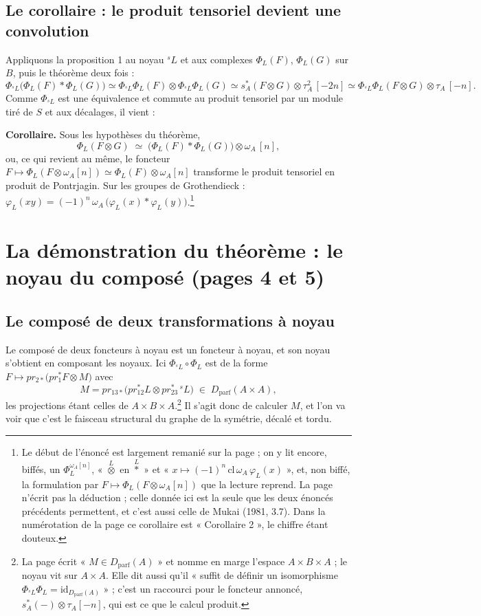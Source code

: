 \documentclass[11pt,a4paper]{article}
\begin{document}
\subsection*{Le corollaire : le produit tensoriel devient une convolution}

Appliquons la proposition 1 au noyau ${}^{s}L$ et aux complexes $\Phi_L(F)$,
$\Phi_L(G)$ sur $B$, puis le théorème deux fois :
\[
  \Phi_{{}^{s}L}\bigl(\Phi_L(F) * \Phi_L(G)\bigr)
  \simeq \Phi_{{}^{s}L}\Phi_L(F) \otimes \Phi_{{}^{s}L}\Phi_L(G)
  \simeq s_A^{*}(F \otimes G) \otimes \tau_A^{2}\,[-2n]
  \simeq \Phi_{{}^{s}L}\Phi_L(F \otimes G) \otimes \tau_A\,[-n].
\]
Comme $\Phi_{{}^{s}L}$ est une équivalence et commute au produit tensoriel
par un module tiré de $S$ et aux décalages, il vient :

\textbf{Corollaire.} Sous les hypothèses du théorème,
\[
  \Phi_L(F \otimes G) \;\simeq\; \bigl(\Phi_L(F) * \Phi_L(G)\bigr) \otimes \omega_A\,[n],
\]
ou, ce qui revient au même, le foncteur $F \mapsto \Phi_L(F \otimes
\omega_A[n]) \simeq \Phi_L(F) \otimes \omega_A[n]$ transforme le produit
tensoriel en produit de Pontrjagin. Sur les groupes de Grothendieck :
$\varphi_L(xy) = (-1)^n\,\omega_A\,\bigl(\varphi_L(x) * \varphi_L(y)\bigr)$.\footnote{Le début de l'énoncé est largement remanié sur la page ; on y lit
encore, biffés, un $\Phi_L^{\omega_A[n]}$, « $\overset{L}{\otimes}$ en
$\overset{L}{*}$ » et « $x \mapsto (-1)^n\,\mathrm{cl}\,\omega_A\,
\varphi_L(x)$ », et, non biffé, la formulation par $F \mapsto \Phi_L(F
\otimes \omega_A[n])$ que la lecture reprend. La page n'écrit pas la
déduction ; celle donnée ici est la seule que les deux énoncés précédents
permettent, et c'est aussi celle de Mukai (1981, 3.7). Dans la numérotation de
la page ce corollaire est « Corollaire 2 », le chiffre étant douteux.}

\section*{La démonstration du théorème : le noyau du composé (pages 4 et 5)}

\subsection*{Le composé de deux transformations à noyau}

Le composé de deux foncteurs à noyau est un foncteur à noyau, et son noyau
s'obtient en composant les noyaux. Ici
$\Phi_{{}^{s}L} \circ \Phi_L$ est de la forme
$F \mapsto pr_{2*}\bigl(pr_1^{*}F \otimes M\bigr)$ avec
\[
  M = pr_{13*}\bigl(pr_{12}^{*}L \otimes pr_{23}^{*}\,{}^{s}L\bigr)
  \;\in\; D_{\mathrm{parf}}(A \times A),
\]
les projections étant celles de $A \times B \times A$.\footnote{La page
écrit « $M \in D_{\mathrm{parf}}(A)$ » et nomme en marge l'espace
$A \times B \times A$ ; le noyau vit sur $A \times A$. Elle dit aussi qu'il
« suffit de définir un isomorphisme $\Phi_{{}^{s}L}\Phi_L =
\mathrm{id}_{D_{\mathrm{parf}}(A)}$ » ; c'est un raccourci pour le foncteur
annoncé, $s_A^{*}(-) \otimes \tau_A[-n]$, qui est ce que le calcul produit.}
Il s'agit donc de calculer $M$, et l'on va voir que c'est le faisceau
structural du graphe de la symétrie, décalé et tordu.
\end{document}
